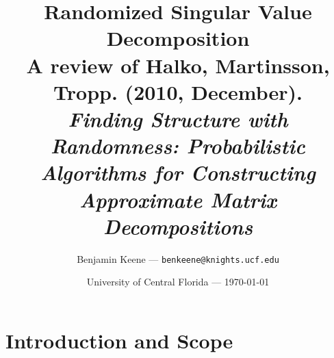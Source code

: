 \documentclass{article}
\title{Randomized Singular Value Decomposition  \\ \small{A review of Halko, Martinsson, Tropp. (2010, December).} \\ \emph{\small{Finding Structure with Randomness: Probabilistic Algorithms for Constructing Approximate Matrix Decompositions}}} %
\author{Benjamin Keene --- \texttt{benkeene@knights.ucf.edu}} %
\date{University of Central Florida --- \today} %
\begin{document}
\maketitle %

{
	\hypersetup{linkcolor=black}
	\tableofcontents
}

\newpage
\section{Introduction and Scope}
\end{document}
